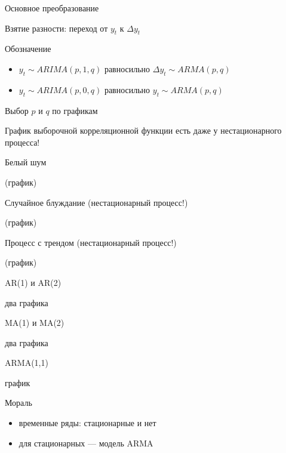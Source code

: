\documentclass[ignorenonframetext,]{beamer}
\begin{document}
\begin{frame}{Основное преобразование}

Взятие разности: переход от $y_t$ к $\Delta y_t$

\end{frame}

\begin{frame}{Обозначение}

\begin{itemize}
\item
  $y_t \sim ARIMA(p,1,q)$ равносильно $\Delta y_t \sim ARMA(p,q)$
\item
  $y_t \sim ARIMA(p,0,q)$ равносильно $y_t \sim ARMA(p,q)$
\end{itemize}

\end{frame}

\begin{frame}{Выбор $p$ и $q$ по графикам}

График выборочной корреляционной функции есть даже у нестационарного
процесса!

\end{frame}

\begin{frame}{Белый шум}

(график)

\end{frame}

\begin{frame}{Случайное блуждание (нестационарный процесс!)}

(график)

\end{frame}

\begin{frame}{Процесс с трендом (нестационарный процесс!)}

(график)

\end{frame}

\begin{frame}{AR(1) и AR(2)}

два графика

\end{frame}

\begin{frame}{MA(1) и MA(2)}

два графика

\end{frame}

\begin{frame}{ARMA(1,1)}

график

\end{frame}

\begin{frame}{Мораль}

\begin{itemize}
\item
  временные ряды: стационарные и нет
\item
  для стационарных --- модель ARMA
\end{itemize}

\end{frame}
\end{document}
